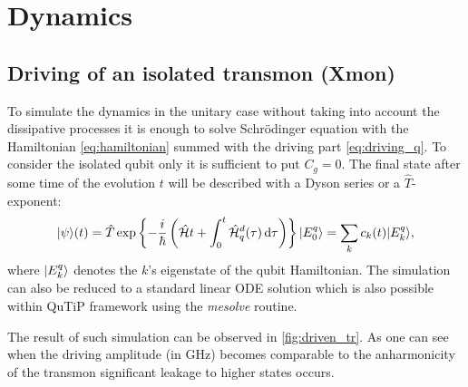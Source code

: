 \documentclass[12pt]{report}
\newcommand{\diff}{\,\mathrm{d}}
\DeclarePairedDelimiter\ket{\lvert}{\rangle}
\newcommand{\rbrkt}[1]{\left( #1 \right)}
\numberwithin{equation}{section}
\begin{document}
\chapter{Dynamics}

\section{Driving of an isolated transmon (Xmon)}

To simulate the dynamics in the unitary case without taking into account the dissipative processes it is enough to solve Schrödinger equation with the Hamiltonian \eqref{eq:hamiltonian} summed with the driving part \eqref{eq:driving_q}. To consider the isolated qubit only it is sufficient to put $C_g = 0$. The final state after some time of the evolution $t$ will be described with a Dyson series or a $\hat T$-exponent:
\begin{equation}
\ket{\psi}(t) = \hat T \exp\left\{-\frac{i}{\hbar} \rbrkt{\mathcal{\hat H}t + \int_0^t \mathcal{\hat H}_q^d(\tau) \diff\tau}\right\} \ket{E_0^q}= \sum_k c_k(t) \ket{E^q_k},
\end{equation} 
where $\ket{E_k^q}$ denotes the $k$'s eigenstate of the qubit Hamiltonian. The simulation can also be reduced to a standard linear ODE solution which is also possible within QuTiP framework using the \textit{mesolve} routine.

The result of such simulation can be observed in \autoref{fig:driven_tr}. As one can see when the driving amplitude (in GHz) becomes comparable to the anharmonicity of the transmon significant leakage to higher states occurs.
\end{document}
